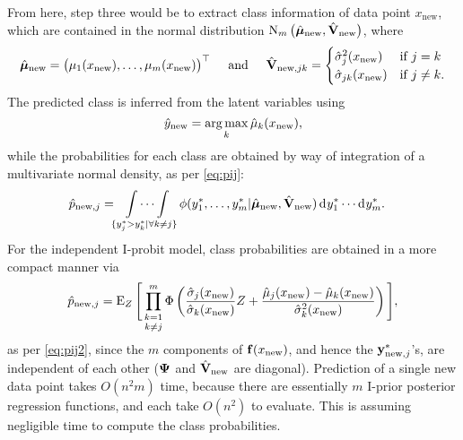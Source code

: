 From here, step three would be to extract class information of data point $x_\text{new}$, which are contained in the normal distribution $\operatorname{N}_{m}\big(\hat{{\bm\mu}}_{\text{new}}, \hat{{\mathbf V}}_{\text{new}} \big)$, where
\begin{equation*}
  \hat{{\bm\mu}}_{\text{new}} = \big(\mu_1(x_\text{new}),\dots, \mu_m(x_\text{new}) \big)^\top 
  \hspace{0.5cm}\text{and}\hspace{0.5cm}
  \hat{{\mathbf V}}_{{\text{new}},jk} = 
  \begin{cases}
    \hat\sigma_j^2(x_\text{new}) & \text{if } j = k \\
    \hat\sigma_{jk}(x_\text{new}) & \text{if } j \neq k. \\
  \end{cases}
\end{equation*}
The predicted class is inferred from the latent variables using
\[
  \hat y_{\text{new}} = \operatorname*{arg\,max}_k \hat\mu_k(x_{\text{new}}), 
\]
while the probabilities for each class are obtained by way of integration of a multivariate normal density, as per \cref{eq:pij}:
\begin{align}
  \hat p_{\text{new},j} 
  &=  \idotsint\displaylimits_{\{y^*_j > y^*_k | \forall k \neq j \}} \phi(y_{1}^*, \dots, y_{m}^*|\hat{{\bm\mu}}_{\text{new}}, \hat{{\mathbf V}}_{{\text{new}}}) \operatorname{d}\hspace{0.5pt}\! y_{1}^* \cdots \operatorname{d}\hspace{0.5pt}\! y_{m}^*.
\end{align}
For the independent I-probit model, class probabilities are obtained in a more compact manner via
\[
  \hat p_{\text{new},j} 
  = \operatorname{E}_Z \Bigg[ \mathop{\prod_{k=1}^m}_{k\neq j} 
  \Phi \left(\frac{\hat\sigma_j(x_\text{new})}{\hat\sigma_k(x_\text{new})} Z + \frac{\hat\mu_j(x_{\text{new}}) - \hat\mu_k(x_{\text{new}})}{\hat\sigma_k^2(x_\text{new})} \right) \Bigg],
\]
as per \cref{eq:pij2}, since the $m$ components of ${\mathbf f}(x_{\text{new}})$, and hence the ${\mathbf y}^*_{{\text{new}},j}$'s, are independent of each other (${\bm\Psi}$ and $\hat{{\mathbf V}}_{\text{new}}$ are diagonal).
Prediction of a single new data point takes $O(n^2m)$ time, because there are essentially $m$ I-prior posterior regression functions, and each take $O(n^2)$ to evaluate.
This is assuming negligible time to compute the class probabilities.

